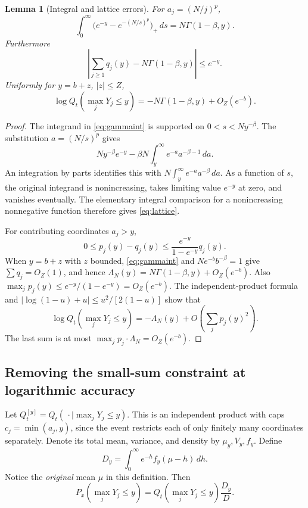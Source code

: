 \documentclass[11pt,a4paper]{article}
\numberwithin{equation}{section}
\newtheorem{lemma}[theorem]{Lemma}
\theoremstyle{definition}
\theoremstyle{remark}
\begin{document}
\begin{lemma}[Integral and lattice errors]
\label{lem:gammaint}
For $a_j=(N/j)^p$,
\begin{equation}
 \int_0^\infty\big(e^{-y}-e^{-(N/s)^p}\big)_+\,ds
       =N\Gamma(1-\beta,y). \label{eq:gammaint}
\end{equation}
Furthermore
\begin{equation}
 \left|\sum_{j\ge1}q_j(y)-N\Gamma(1-\beta,y)\right|
       \le e^{-y}. \label{eq:lattice}
\end{equation}
Uniformly for $y=b+z$, $|z|\le Z$,
\begin{equation}
 \log Q_t(\max_jY_j\le y)
       =-N\Gamma(1-\beta,y)+O_Z(e^{-b}).
 \label{eq:tiltedmax}
\end{equation}
\end{lemma}
\begin{proof}
The integrand in \eqref{eq:gammaint} is supported on
$0<s<Ny^{-\beta}$. The substitution $a=(N/s)^p$ gives
\[
 Ny^{-\beta}e^{-y}
 -\beta N\int_y^\infty e^{-a}a^{-\beta-1}\,da.
\]
An integration by parts identifies this with
$N\int_y^\infty e^{-a}a^{-\beta}\,da$. As a function of $s$, the
original integrand is nonincreasing, takes limiting value $e^{-y}$
at zero, and vanishes eventually. The elementary integral comparison
for a nonincreasing nonnegative function therefore gives
\eqref{eq:lattice}.

For contributing coordinates $a_j>y$,
\[
 0\le p_j(y)-q_j(y)
 \le\frac{e^{-y}}{1-e^{-y}}q_j(y).
\]
When $y=b+z$ with $z$ bounded, \eqref{eq:gammaint} and
$Ne^{-b}b^{-\beta}=1$ give
$\sum q_j=O_Z(1)$, and hence
$\Lambda_N(y)=N\Gamma(1-\beta,y)+O_Z(e^{-b})$.
Also $\max_jp_j(y)\le e^{-y}/(1-e^{-y})=O_Z(e^{-b})$.
The independent-product formula and
$|\log(1-u)+u|\le u^2/[2(1-u)]$ show that
\[
 \log Q_t(\max_jY_j\le y)
 =-\Lambda_N(y)+O\!\left(\sum_jp_j(y)^2\right).
\]
The last sum is at most $\max_jp_j\cdot\Lambda_N=O_Z(e^{-b})$.
\end{proof}

\subsection{Removing the small-sum constraint at logarithmic accuracy}
Let $Q_t^{[y]}=Q_t(\,\cdot\mid\max_jY_j\le y)$. This is an
independent product with caps $c_j=\min(a_j,y)$, since the event
restricts each of only finitely many coordinates separately. Denote
its total mean, variance, and density by $\mu_y,V_y,f_y$. Define
\begin{equation}
 D_y=\int_0^\infty e^{-h}f_y(\mu-h)\,dh. \label{eq:Dy}
\end{equation}
Notice the \emph{original} mean $\mu$ in this definition. Then
\begin{equation}
 P_x(\max_jY_j\le y)
    =Q_t(\max_jY_j\le y)\frac{D_y}{D}. \label{eq:capidentity}
\end{equation}
\end{document}

